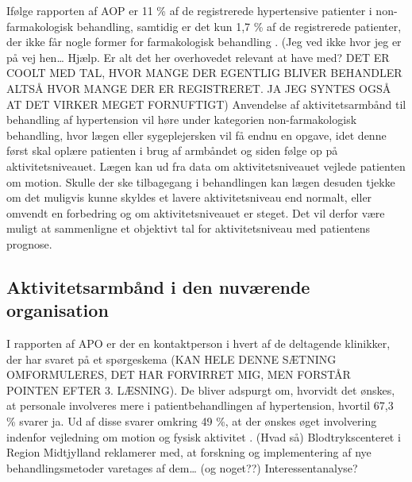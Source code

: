 Ifølge rapporten af AOP er 11 \% af de registrerede hypertensive patienter i non-farmakologisk behandling, samtidig er det kun 1,7 \% af de registrerede patienter, der ikke får nogle former for farmakologisk behandling \citep{munch2007}.
 (Jeg ved ikke hvor jeg er på vej hen… Hjælp. Er alt det her overhovedet relevant at have med? DET ER COOLT MED TAL, HVOR MANGE DER EGENTLIG BLIVER BEHANDLER ALTSÅ HVOR MANGE DER ER REGISTRERET. JA JEG SYNTES OGSÅ AT DET VIRKER MEGET FORNUFTIGT)
Anvendelse af aktivitetsarmbånd til behandling af hypertension vil høre under kategorien non-farmakologisk behandling, hvor lægen eller sygeplejersken vil få endnu en opgave, idet denne først skal oplære patienten i brug af armbåndet og siden følge op på aktivitetsniveauet. Lægen kan ud fra data om aktivitetsniveauet vejlede patienten om motion. Skulle der ske tilbagegang i behandlingen kan lægen desuden tjekke om det muligvis kunne skyldes et lavere aktivitetsniveau end normalt, eller omvendt en forbedring og om aktivitetsniveauet er steget. Det vil derfor være muligt at sammenligne et objektivt tal for aktivitetsniveau med patientens prognose. 

\subsection{Aktivitetsarmbånd i den nuværende organisation}
I rapporten af APO er der en kontaktperson i hvert af de deltagende klinikker, der har svaret på et spørgeskema (KAN HELE DENNE SÆTNING OMFORMULERES, DET HAR FORVIRRET MIG, MEN FORSTÅR POINTEN EFTER 3. LÆSNING). De bliver adspurgt om, hvorvidt det ønskes, at personale involveres mere i patientbehandlingen af hypertension, hvortil 67,3 \% svarer ja. Ud af disse svarer omkring 49 \%, at der ønskes øget involvering indenfor vejledning om motion og fysisk aktivitet \citep{munch2007}. 
(Hvad så)
Blodtrykscenteret i Region Midtjylland reklamerer med, at forskning og implementering af nye behandlingsmetoder varetages af dem…  \citep{aarhusuniversitetshospital} (og noget??)
Interessentanalyse?


